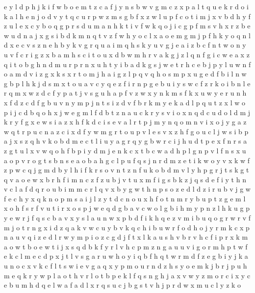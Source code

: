 \documentclass{article}
\begin{document}
e y
l d p h j k i f w b o e m t z c a
f j y n s b w v g m c z x p a l t q u e k r d o
i k a l h e n j o d v y t q c u r p w z m s g b f x
z w l u p f c o t i m j x v b d h
y f z u
l e x c y b o q g p r s d u m a n h k t i v f w
k q o j i c g p f m s v h x r z b e w u d n a
j x g s i b d k m n q t v z f w h y o c l
x a o e m
g m j p f h k y o q n l d x e c v
s z n e h b y k v g r q u a i m
q h s k y u v g j e a i z b c f n
t w o n y u v f c r i g z x b a m h s
c i t o u x d b w m h r v a k g j z l q n f
g i
c w e a x z q i t o b g h n d m u r p
r n x u h t y i b a d k g s j w e
t r h c e b j p y l u w n f o a m d v i z g x k s
x r t o m j h a i g z l p q
v q h o s m p x u g e d f b i l
n w g b p l h k j d s m x t o u a v c y q e z f i r
n p g e b u i y s w c f z r k
o i b n l e r q m x w z d c f y p a t j v s g u h
a p f v z w x y n k m
s f k x u w
y e r u n h x f d z
c d f g b u v n y m
p j n t s i z d v f b r k m y
e k a d l p q u t z
x l w o p i j c d b
q o h x j w e g m l f d b t z n a u c k r y s v i
o x n q d c
u d
o l
d m j k r y f g x e w s i a
z x h f k d c i s e v a l r t p j m y n q o
m n v i x o j y g a z w q t r p u c
n a z c i x d f y w m g r t o u p v l e s
v x z h f g o u c l j w s i b p a
j x s z q h v k o b d m e c t l i u y a g r
q y g b w r c i j h u d t p e x f n
r s a z g t u l x v w q o h f b p i y d m j e n k c
x t b c w a d h p l g n
p v l f n s x u a o
p v r o g t s b n
s e a o b
a h g c l p u f q s j n r d m z e t i k w o y v x
k w
f z
p w c q j g m d b y l h i f k r s o v n t z
n f u k o b d m v l y h p g r j t
s k g t q v a o e w x b r h f i m n c z
f z u b j
v t u x m f i g s b
k z j q s d e f i y t h n v c l a
f d q r o u b i m
m c r l q v x b y g w t h n p s o z e d
l d z i r u b v j g w f e c h y x q k n o p m s a
i j l z y t d c n o u x h
f o t n
m
r y b u p t z g e m l x o h f s
r
f v u t i r x o s p j w e q d g b
a v c w o l g b i h m y p n z
l h k u g p y e w r j f q s c b a v x
y s l a u n w x p b d f i k h q e z
v m i b u q o g r w
r v
f m j o t r n g x i d z q a k v w c u y b
v k q c h i b u w r f o d
h o j y r m k c x p n a u v q i z e d l
r w y m p i o z c g d j f t x l k a u s h v b
r
v h c f i p r x k m a o w t b
o e w t i j x s q d b k f y r l v h c p m z n g a u
u v i g o r m h p t w f e k c l
m e c d p x j t l v s g a r u w h o y i q b f
h q t w r m d f z e g b i y j k a u n o c x v
k c f l t s w i e v g a q x y p m o u r n d z h
s y o e m k j b r
j p u
h m e q k r y w p l a o t
h v r
l o
t
b p e k l f q s n g h j a x v w y z m o r c i
x y c e b u m
h d q e l w a
f a d l x r q s u c j
b g s t v h j p r d w x m u c l y z k o
\end{document}
